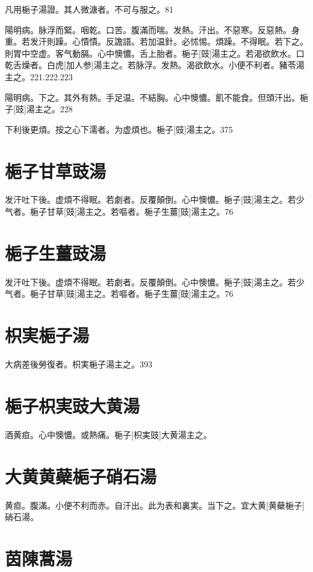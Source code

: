 \documentclass[12pt,oneside,UTF8,b5paper]{ctexbook}她她她她她她她
\begin{document}
凡用梔子湯證。其人微溏者。不可与服之。81

陽明病。脉浮而緊。咽乾。口苦。腹滿而喘。发熱。汗出。不惡寒。反惡熱。身重。若发汗則躁。心憒憒。反譫語。若加温針。必怵惕。煩躁。不得眠。若下之。則胃中空虚。客气動膈。心中懊憹。舌上胎者。梔子[豉]湯主之。若渴欲飲水。口乾舌燥者。白虎[加人参]湯主之。若脉浮。发熱。渴欲飲水。小便不利者。豬苓湯主之。221.222.223

陽明病。下之。其外有熱。手足温。不結胸。心中懊憹。飢不能食。但頭汗出。梔子[豉]湯主之。228

下利後更煩。按之心下濡者。为虚煩也。梔子[豉]湯主之。375

\section{梔子甘草豉湯}

发汗吐下後。虚煩不得眠。若劇者。反覆顛倒。心中懊憹。梔子[豉]湯主之。若少气者。梔子甘草[豉]湯主之。若嘔者。梔子生薑[豉]湯主之。76

\section{梔子生薑豉湯}

发汗吐下後。虚煩不得眠。若劇者。反覆顛倒。心中懊憹。梔子[豉]湯主之。若少气者。梔子甘草[豉]湯主之。若嘔者。梔子生薑[豉]湯主之。76

\section{枳実梔子湯}

大病差後勞復者。枳実梔子湯主之。393

\section{梔子枳実豉大黄湯}

酒黄疸。心中懊憹。或熱痛。梔子[枳実豉]大黄湯主之。

\section{大黄黄蘗梔子硝石湯}

黄疸。腹滿。小便不利而赤。自汗出。此为表和裏実。当下之。宜大黄[黄蘗梔子]硝石湯。

\section{茵陳蒿湯}
\end{document}
